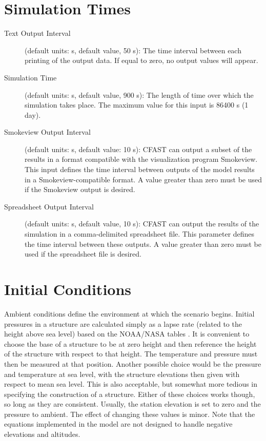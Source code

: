 \section{Simulation Times}
\label{info:TIME}

\begin{description}
\item[Text Output Interval] (default units: s, default value, 50 s): The time interval between each printing of the output data.  If equal to zero, no output values will appear.

\item[Simulation Time] (default units: s, default value, 900 s): The length of time over which the simulation takes place. The maximum value for this input is 86400 s (1 day).

\item[Smokeview Output Interval] (default units: s, default value: 10 s): CFAST can output a subset of the results in a format compatible with the visualization program Smokeview. This input defines the time interval between outputs of the model results in a Smokeview-compatible format.  A value greater than zero must be used if the Smokeview output is desired.

\item[Spreadsheet Output Interval] (default units: s, default value, 10 s): CFAST can output the results of the simulation in a comma-delimited spreadsheet file. This parameter defines the time interval between these outputs. A value greater than zero must be used if the spreadsheet file is desired.
\end{description}




\section{Initial Conditions}
\label{info:INIT}

Ambient conditions define the environment at which the scenario begins. Initial pressures in a structure are calculated simply as a lapse rate (related to the height above sea level) based on the NOAA/NASA tables \cite{GPO:Atmosphere}. It is convenient to choose the base of a structure to be at zero height and then reference the height of the structure with respect to that height.  The temperature and pressure must then be measured at that position.  Another possible choice would be the pressure and temperature at sea level, with the structure elevations then given with respect to mean sea level.  This is also acceptable, but somewhat more tedious in specifying the construction of a structure.  Either of these choices works though, so long as they are consistent. Usually, the station elevation is set to zero and the pressure to ambient. The effect of changing these values is minor. Note that the equations implemented in the model are not designed to handle negative elevations and altitudes.

